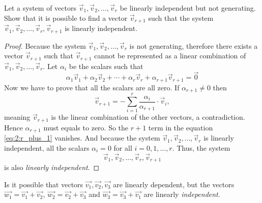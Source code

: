 \begin{exercise}
  Let a system of vectors $\vec{v}_1,\vec{v}_2,\dots, \vec{v}_r$
  be linearly independent but not generating. Show that it is possible 
  to find a vector $\vec{v}_{r+1}$ such that the system 
  $\vec{v}_1,\vec{v}_2, \dots, \vec{v}_r,\vec{v}_{r+1}$ is linearly 
  independent.
\end{exercise}
\begin{proof}
  Because the system $\vec{v}_1,\vec{v}_2,\dots, \vec{v}_r$ is not generating, 
  therefore there exists a vector $\vec{v}_{r+1}$ such that $\vec{v}_{r+1}$ 
  cannot be represented as a linear combination of $\vec{v}_1,\vec{v}_2,\dots, \vec{v}_r$.
  Let $\alpha_i$ be the scalars such that 
  \begin{equation}
    \label{eq:2:r_plus_1}
    \alpha_1\vec{v}_1+\alpha_2\vec{v}_2+\cdots+\alpha_r\vec{v}_r+\alpha_{r+1}\vec{v}_{r+1}=\vec{0}
  \end{equation}
  Now we have to prove that all the scalars are all zero.
  If $\alpha_{r+1}\neq 0$ then 
  \[
    \vec{v}_{r+1}=-\sum_{i=1}^{r}\frac{\alpha_i}{\alpha_{r+1}}\cdot\vec{v}_{i},
  \]
  meaning $\vec{v}_{r+1}$ is the linear combination of the other vectors, 
  a contradiction. Hence $\alpha_{r+1}$ must equals to zero. So
  the $r+1$ term in the equation \eqref{eq:2:r_plus_1} vanishes. And 
  because the system $\vec{v}_1,\vec{v}_2,\dots, \vec{v}_r$ is linearly independent, 
  all the scalars $\alpha_i=0$ for all $i=0,1,\dots,r$. Thus, the system
  \[
    \vec{v}_1,\vec{v}_2,\dots, \vec{v}_r, \vec{v}_{r+1}
  \]
  is also \emph{linearly independent}.
\end{proof}
\begin{exercise}
  Is it possible that vectors $\vec{v_1}, \vec{v_2}, \vec{v_3}$
  are linearly dependent, but the vectors $\vec{w_1}=\vec{v_1}+\vec{v_2}$,
  $\vec{w_2}=\vec{v_2}+\vec{v_3}$ and $\vec{w_3}=\vec{v_3}+\vec{v_1}$
  are linearly \emph{independent}.
\end{exercise}
